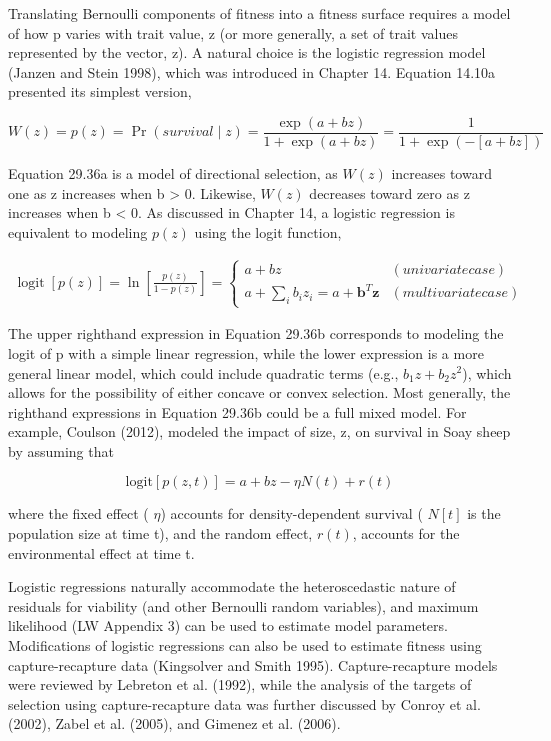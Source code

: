 \documentclass{article}
\begin{document}
Translating Bernoulli components of fitness into a fitness surface requires a model of how p varies with trait value, z (or more generally, a set of trait values represented by the vector, z). A natural choice is the logistic regression model (Janzen and Stein 1998), which was introduced in Chapter 14. Equation 14.10a presented its simplest version,

\begin{equation}
W(z)=p(z)=\Pr(survival\mid z)=\frac{\exp(a+bz)}{1+\exp(a+bz)}=\frac{1}{1+\exp(-[a+bz])}
\tag{29.36a}
\label{eq:29_36a}
\end{equation}

Equation 29.36a is a model of directional selection, as  $ W(z) $ increases toward one as z increases when b > 0. Likewise,  $ W(z) $ decreases toward zero as z increases when b < 0. As discussed in Chapter 14, a logistic regression is equivalent to modeling  $ p(z) $ using the logit function,

\begin{equation}
\begin{aligned}\operatorname{logit}[p(z)]=\ln\left[\frac{p(z)}{1-p(z)}\right]=\begin{cases}a+b z&(univariate case)\\a+\sum_{i}b_{i}z_{i}=a+\mathbf{b}^{T}\mathbf{z}&(multivariate case)\end{cases}\end{aligned}
\tag{29.36b}
\label{eq:29_36b}
\end{equation}

The upper righthand expression in Equation 29.36b corresponds to modeling the logit of p with a simple linear regression, while the lower expression is a more general linear model, which could include quadratic terms (e.g.,  $ b_{1}z + b_{2}z^{2} $), which allows for the possibility of either concave or convex selection. Most generally, the righthand expressions in Equation 29.36b could be a full mixed model. For example, Coulson (2012), modeled the impact of size, z, on survival in Soay sheep by assuming that

\begin{equation}
\mathrm{logit}[p(z,t)]=a+bz-\eta N(t)+r(t)
\end{equation}

where the fixed effect ( $ \eta $) accounts for density-dependent survival ( $ N[t] $ is the population size at time t), and the random effect,  $ r(t) $, accounts for the environmental effect at time t.

Logistic regressions naturally accommodate the heteroscedastic nature of residuals for viability (and other Bernoulli random variables), and maximum likelihood (LW Appendix 3) can be used to estimate model parameters. Modifications of logistic regressions can also be used to estimate fitness using capture-recapture data (Kingsolver and Smith 1995). Capture-recapture models were reviewed by Lebreton et al. (1992), while the analysis of the targets of selection using capture-recapture data was further discussed by Conroy et al. (2002), Zabel et al. (2005), and Gimenez et al. (2006).
\end{document}

